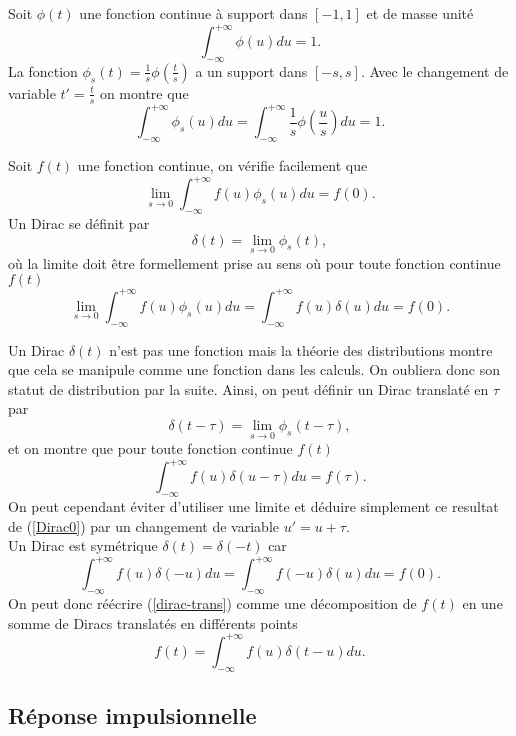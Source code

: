Soit $\phi (t)$ une fonction continue \`a support dans $[-1,1]$ et
de masse unit\'e
\begin{equation}
\label{Dirac0}
\int_{-\infty}^{+\infty} \phi (u) du = 1 .
\end{equation}
La fonction $\phi_s (t) = \frac 1 s \phi ( \frac t s )$ a un
support dans $[-s,s]$. Avec le changement de variable
$t' = \frac t s$ on montre que
\[
\int_{-\infty}^{+\infty} \phi_s (u) du =
\int_{-\infty}^{+\infty} \frac 1 s \phi ( \frac u s ) du = 1 .
\]

Soit $f(t)$ une fonction continue, on v\'erifie facilement que
\[
\lim_{s \rightarrow 0} 
\int_{-\infty}^{+\infty} f(u) \phi_s (u) du = f(0) .
\]
Un Dirac se d\'efinit par
\[
\delta (t) = \lim_{s \rightarrow 0} \phi_s (t),
\]
o\`u la limite doit \^etre formellement prise au sens o\`u
pour toute fonction continue $f(t)$
\begin{equation}
\lim_{s \rightarrow 0} 
\int_{-\infty}^{+\infty} f(u) \phi_s (u) du = 
\int_{-\infty}^{+\infty} f (u) \delta (u) du = f(0).
\end{equation}

Un Dirac $\delta (t)$ n'est pas une fonction mais la th\'eorie
des distributions montre que cela se manipule
comme une fonction dans les calculs. On oubliera donc son 
statut de distribution par la suite.
Ainsi, on peut d\'efinir un Dirac translat\'e en $\tau$ par
\[
\delta (t-\tau) = \lim_{s \rightarrow 0} \phi_s (t-\tau),
\]
et on montre que pour toute fonction continue $f(t)$
\begin{equation}
\label{dirac-trans}
\int_{-\infty}^{+\infty} f (u) \delta (u-\tau) du = f(\tau).
\end{equation}
On peut cependant \'eviter d'utiliser une limite
et d\'eduire simplement ce resultat de (\ref{Dirac0}) par un
changement de variable $u' = u + \tau$.\\

Un Dirac est sym\'etrique $\delta (t) = \delta (-t)$ car
\[
\int_{-\infty}^{+\infty} f (u) \delta (-u) du = 
\int_{-\infty}^{+\infty} f (-u) \delta (u) du = f(0).
\]
On peut donc r\'e\'ecrire (\ref{dirac-trans}) 
comme une d\'ecomposition de $f(t)$ en une somme de Diracs
translat\'es en diff\'erents points
\[
f(t) = \int_{-\infty}^{+\infty} f(u) \delta (t-u) du .
\]

\subsection{R\'eponse impulsionnelle}

